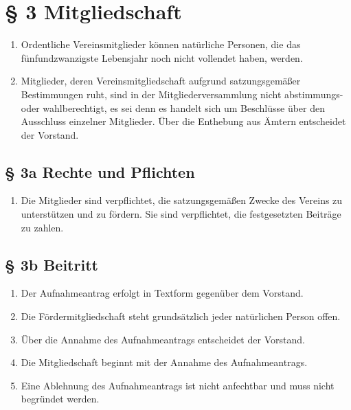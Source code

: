 \documentclass[11pt,a4paper]{scrartcl}
\begin{document}
\section*{§ 3 Mitgliedschaft}
\begin{enumerate}[label=\arabic*.]
    \item Ordentliche Vereinsmitglieder können natürliche Personen, die das fünfundzwanzigste Lebensjahr noch nicht vollendet haben, werden.
    \item Mitglieder, deren Vereinsmitgliedschaft aufgrund satzungsgemäßer Bestimmungen ruht, sind in der Mitgliederversammlung nicht abstimmungs- oder wahlberechtigt, es sei denn es handelt sich um Beschlüsse über den Ausschluss einzelner Mitglieder. Über die Enthebung aus Ämtern entscheidet der Vorstand.
\end{enumerate}

\subsection*{§ 3a Rechte und Pflichten}
\begin{enumerate}[label=\arabic*.]
    \item Die Mitglieder sind verpflichtet, die satzungsgemäßen Zwecke des Vereins zu unterstützen und zu fördern. Sie sind verpflichtet, die festgesetzten Beiträge zu zahlen.
\end{enumerate}

\subsection*{§ 3b Beitritt}
\begin{enumerate}[label=\arabic*.]
    \item Der Aufnahmeantrag erfolgt in Textform gegenüber dem Vorstand.
    \item Die Fördermitgliedschaft steht grundsätzlich jeder natürlichen Person offen.
    \setcounter{enumi}{3} %
    \item Über die Annahme des Aufnahmeantrags entscheidet der Vorstand.
    \item Die Mitgliedschaft beginnt mit der Annahme des Aufnahmeantrags.
    \item Eine Ablehnung des Aufnahmeantrags ist nicht anfechtbar und muss nicht begründet werden.
\end{enumerate}
\end{document}
